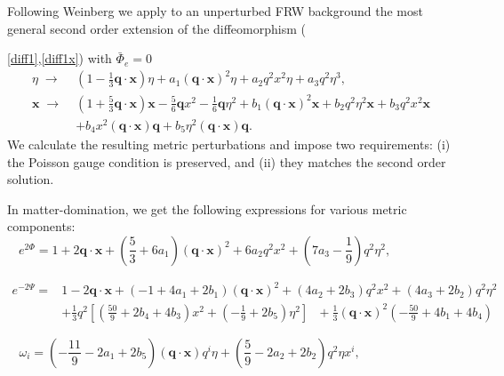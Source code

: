 \documentclass[12pt]{article}
\numberwithin{equation}{section}
\def\bsb{\boldsymbol}
\def\be{\begin{equation}}
\def\ee{\end{equation}}
\begin{document}
Following Weinberg \cite{Weinberg} we apply to an unperturbed FRW background the most general second order extension of the diffeomorphism ({\ref{diff1},\ref{diff1x}) with $\bar\Phi_e=0$
\be\label{diff2}
\begin{split}
\eta \;\to\; & (1-\frac{1}{3}\bsb q\cdot \bsb x)\eta +a_1 (\bsb q\cdot \bsb x)^2\eta+a_2q^2 x^2 \eta +a_3 q^2 \eta^3,\\[10pt]
\bsb x\;\to\; &(1+\frac{5}{3}\bsb q\cdot \bsb x)\bsb x -\frac{5}{6}\bsb q x^2 -\frac{1}{6}\bsb q \eta^2 + b_1(\bsb q\cdot \bsb x)^2\bsb x+b_2q^2 \eta^2 \bsb x +b_3 q^2 x^2 \bsb x \\[10pt]
& +b_4 x^2 (\bsb q\cdot \bsb x) \bsb q+b_5 \eta^2 (\bsb q\cdot \bsb x)  \bsb q.
\end{split}
\ee
We calculate the resulting metric perturbations and impose two requirements: (i) the Poisson gauge condition is preserved, and (ii) they matches the second order solution.

In matter-domination, we get the following expressions for various metric components:
\be
\label{Phi_diff}
e^{2\Phi}=1+2\bsb q\cdot \bsb x+(\frac{5}{3}+6a_1)(\bsb q\cdot \bsb x)^2+6a_2 q^2 x^2 +(7a_3-\frac{1}{9})q^2\eta^2,~~~~~~~~~~~~~~~~~~~
\ee

\be
\label{Psi_diff}
\begin{split}
e^{-2\Psi}=&1-2\bsb q\cdot \bsb x+(-1+4a_1+2b_1)(\bsb q\cdot \bsb x)^2+(4a_2+2b_3)q^2x^2+(4a_3+2b_2)q^2\eta^2~~~~~\\[10pt]
&+\frac{1}{3}q^2[(\frac{50}{9}+2b_4 +4b_3)x^2 +(-\frac{1}{9}+2b_5)\eta^2]~~~
+\frac{1}{3}(\bsb q\cdot \bsb x)^2(-\frac{50}{9}+4b_1+4b_4)
\end{split}
\ee

\be\label{omega_diff}
\omega_i = (-\frac{11}{9}-2a_1+2b_5)(\bsb q\cdot \bsb x) q^i \eta+(\frac{5}{9}-2a_2+2b_2)q^2\eta x^i,~~~~~~~~~~~~~~~~~~~~~~~~~~~~~~
\ee

}
\end{document}
